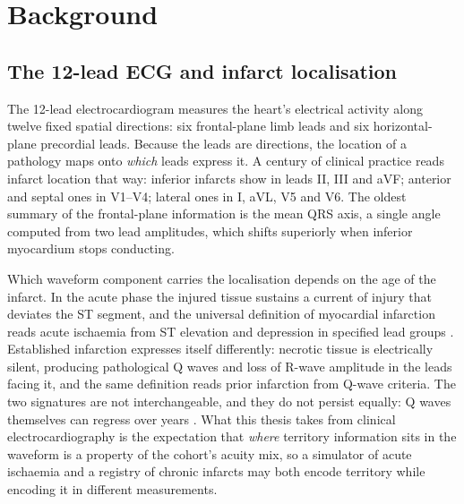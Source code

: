 \chapter{Background}
\label{ch:background}

\section{The 12-lead ECG and infarct localisation}
\label{sec:bg-ecg}

The 12-lead electrocardiogram measures the heart's electrical activity along twelve fixed spatial directions: six frontal-plane limb leads and six horizontal-plane precordial leads. Because the leads are directions, the location of a pathology maps onto \emph{which} leads express it. A century of clinical practice reads infarct location that way: inferior infarcts show in leads II, III and aVF; anterior and septal ones in V1--V4; lateral ones in I, aVL, V5 and V6. The oldest summary of the frontal-plane information is the mean QRS axis, a single angle computed from two lead amplitudes, which shifts superiorly when inferior myocardium stops conducting. 

Which waveform component carries the localisation depends on the age of the infarct. In the acute phase the injured tissue sustains a current of injury that deviates the ST segment, and the universal definition of myocardial infarction reads acute ischaemia from ST elevation and depression in specified lead groups \citep{thygesen2018fourth}. Established infarction expresses itself differently: necrotic tissue is electrically silent, producing pathological Q waves and loss of R-wave amplitude in the leads facing it, and the same definition reads prior infarction from Q-wave criteria. The two signatures are not interchangeable, and they do not persist equally: Q waves themselves can regress over years \citep{das2006significance}. What this thesis takes from clinical electrocardiography is the expectation that \emph{where} territory information sits in the waveform is a property of the cohort's acuity mix, so a simulator of acute ischaemia and a registry of chronic infarcts may both encode territory while encoding it in different measurements.

